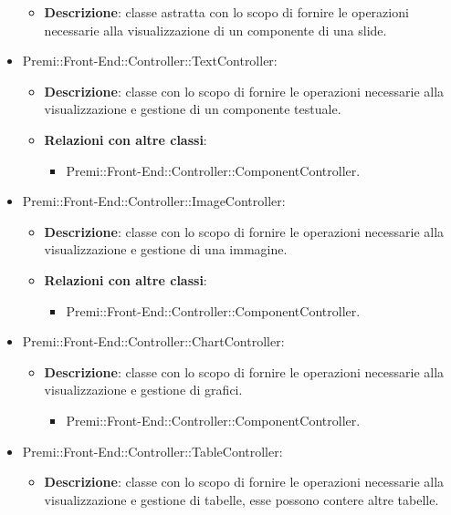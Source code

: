 \begin{itemize}
			 \begin{itemize}
				\item \textbf{Descrizione}: classe astratta con lo scopo di fornire le operazioni necessarie alla visualizzazione di un componente di una slide.
			\end{itemize}
		\item  Premi::Front-End::Controller::TextController: 
			 \begin{itemize}
				\item \textbf{Descrizione}: classe con lo scopo di fornire le operazioni necessarie alla visualizzazione e gestione di un componente testuale.
				\item \textbf{Relazioni con altre classi}:
				\begin{itemize}
					\item Premi::Front-End::Controller::ComponentController.
				\end{itemize}
			\end{itemize}
		\item  Premi::Front-End::Controller::ImageController: 
			 \begin{itemize}
				\item \textbf{Descrizione}: classe con lo scopo di fornire le operazioni necessarie alla visualizzazione e gestione di una immagine.
				\item \textbf{Relazioni con altre classi}:
				\begin{itemize}
					\item Premi::Front-End::Controller::ComponentController.
				\end{itemize}
			\end{itemize}
		\item  Premi::Front-End::Controller::ChartController: 
			 \begin{itemize}
				\item \textbf{Descrizione}: classe con lo scopo di fornire le operazioni necessarie alla visualizzazione e gestione di grafici.
				\begin{itemize}
					\item Premi::Front-End::Controller::ComponentController.
				\end{itemize}
			 \end{itemize}
		\item  Premi::Front-End::Controller::TableController: 
			 \begin{itemize}
				\item \textbf{Descrizione}: classe con lo scopo di fornire le operazioni necessarie alla visualizzazione e gestione di tabelle, esse possono contere altre tabelle.

\end{itemize}
\end{itemize}
